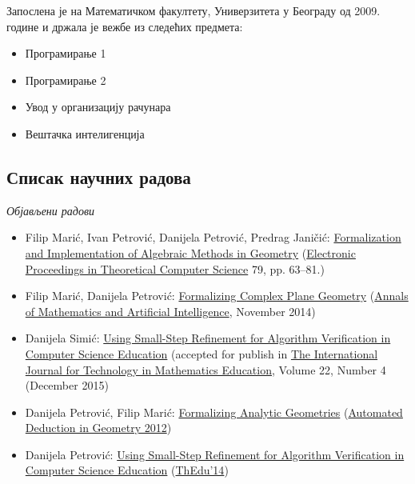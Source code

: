 \documentclass{article}
\begin{document}
   Запослена је на Математичком факултету, Универзитета у Београду од 2009.
   године и држала је вежбе из следећих предмета:
   \begin{itemize}
   \item Програмирање 1
   \item Програмирање 2
   \item Увод у организацију рачунара
   \item Вештачка интелигенција
   \end{itemize}
   
\subsection{Списак научних радова}

{\em Објављени радови}
\begin{itemize}
\item {\lat Filip Marić, Ivan Petrović, Danijela Petrović, Predrag Janičić: \href{http://eptcs.web.cse.unsw.edu.au/paper.cgi?THedu11.4}{Formalization and Implementation of Algebraic Methods in Geometry} (\href{http://about.eptcs.org/}{Electronic Proceedings in Theoretical Computer Science} 79, pp. 63–81.)}
\item {\lat Filip Mari\'c, Danijela Petrovi\'c: \href{http://argo.matf.bg.ac.rs/publications/2014/moebius.pdf}{Formalizing Complex Plane Geometry} (\href{http://link.springer.com/article/10.1007/s10472-014-9436-4}{Annals of Mathematics and Artificial Intelligence}, November 2014)}
\item {\lat Danijela Simi\'c: \href{http://argo.matf.bg.ac.rs/publications/2014/small-step-verification.pdf}{Using Small-Step Refinement for Algorithm Verification in Computer Science Education} (accepted for publish in \href{https://www.fose1.plymouth.ac.uk/mathematics\_education/field\%20of\%20work/IJTME/}{The International Journal for Technology in Mathematics Education}, Volume 22, Number 4 (December 2015)}
\end{itemize}

\begin{itemize}
\item {\lat Danijela Petrovi\'c, Filip Mari\'c: \href{http://poincare.matf.bg.ac.rs/~danijela/publications/ADG2012.pdf}{Formalizing Analytic Geometries} (\href{http://dream.inf.ed.ac.uk/events/adg2012/}{Automated Deduction in Geometry 2012})}
\item {\lat Danijela Petrovi\'c: \href{http://poincare.matf.bg.ac.rs/~danijela/publications/text.pdf}{Using Small-Step Refinement for Algorithm Verification in Computer Science Education} (\href{http://www.uc.pt/en/congressos/thedu/thedu14}{ThEdu'14})}
\end{itemize}
\end{document}

